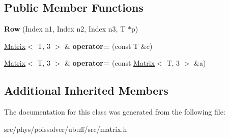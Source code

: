 \subsection*{Public Member Functions}
\begin{DoxyCompactItemize}
\item 
{\bfseries Row} (Index n1, Index n2, Index n3, T $\ast$p)\hypertarget{classcpt_1_1Row_3_01T_00_013_01_4_adf681155a96633dffb226535aaec2c20}{}\label{classcpt_1_1Row_3_01T_00_013_01_4_adf681155a96633dffb226535aaec2c20}

\item 
\hyperlink{classcpt_1_1Matrix}{Matrix}$<$ T, 3 $>$ \& {\bfseries operator=} (const T \&c)\hypertarget{classcpt_1_1Row_3_01T_00_013_01_4_a9b2af695ad64ed848df4129c34237ff6}{}\label{classcpt_1_1Row_3_01T_00_013_01_4_a9b2af695ad64ed848df4129c34237ff6}

\item 
\hyperlink{classcpt_1_1Matrix}{Matrix}$<$ T, 3 $>$ \& {\bfseries operator=} (const \hyperlink{classcpt_1_1Matrix}{Matrix}$<$ T, 3 $>$ \&a)\hypertarget{classcpt_1_1Row_3_01T_00_013_01_4_abed3a4282fc3c6a73e1c06a8ce3d5acc}{}\label{classcpt_1_1Row_3_01T_00_013_01_4_abed3a4282fc3c6a73e1c06a8ce3d5acc}

\end{DoxyCompactItemize}
\subsection*{Additional Inherited Members}


The documentation for this class was generated from the following file\+:\begin{DoxyCompactItemize}
\item 
src/phys/poissolver/ubuff/src/matrix.\+h\end{DoxyCompactItemize}
